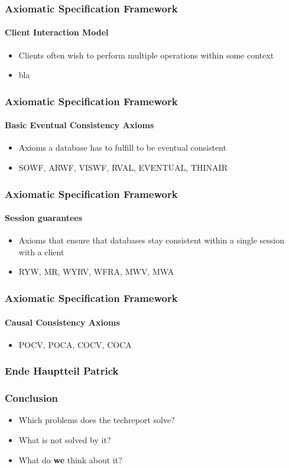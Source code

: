 \documentclass[11pt]{beamer}
\begin{document}
\begin{frame}
\frametitle{Axiomatic Specification Framework}
\framesubtitle{Client Interaction Model}
\begin{itemize}
\item Clients often wish to perform multiple operations within some context
\item bla   
\end{itemize}
\end{frame}

\begin{frame}
\frametitle{Axiomatic Specification Framework}
\framesubtitle{Basic Eventual Consistency Axioms}
\begin{itemize}
\item Axioms a database has to fulfill to be eventual consistent
\item SOWF, ARWF, VISWF, RVAL, EVENTUAL, THINAIR
\end{itemize}
\end{frame}

\begin{frame}
\frametitle{Axiomatic Specification Framework}
\framesubtitle{Session guarantees}
\begin{itemize}
\item Axioms that ensure that databases stay consistent within a single session with a client
\item RYW, MR, WYRV, WFRA, MWV, MWA
\end{itemize}
\end{frame}

\begin{frame}
\frametitle{Axiomatic Specification Framework}
\framesubtitle{Causal Consistency Axioms}
\begin{itemize}
\item POCV, POCA, COCV, COCA
\end{itemize}
\end{frame}

\begin{frame}
\frametitle{Ende Hauptteil Patrick}
\end{frame}


\begin{frame}
\frametitle{Conclusion}
\begin{itemize}
\item Which problems does the techreport solve?
\item What is not solved by it?
\item What do \textbf{we} think about it?
\end{itemize}
\end{frame}
\end{document}
